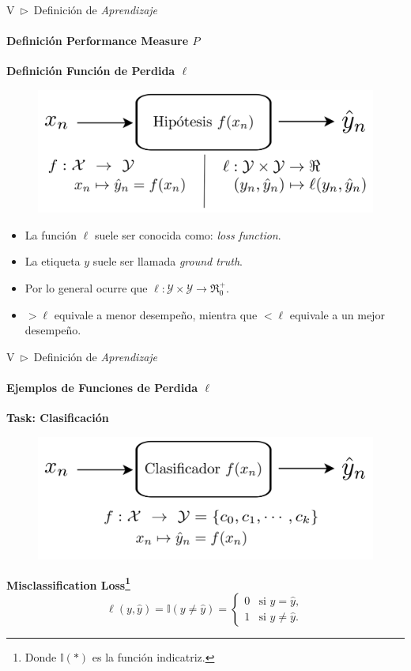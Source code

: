\documentclass[xcolor=dvipsnames]{beamer}
\begin{document}
    \begin{frame}{V~$\rhd$~Definición de \textit{Aprendizaje}}
    \framesubtitle{Definición Performance Measure \( P \)}
        \textbf{\Large{Definición Función de Perdida $\ell$}}
        \begin{figure}
            \centering
            \includegraphics[width=0.5\linewidth]{imgs/def03/measure03.png}
        \end{figure}
        \begin{itemize}
            \item La función $\ell$ suele ser conocida como: \textit{loss function}.
            \item La etiqueta $y$ suele ser llamada \textit{ground truth}.
            \item Por lo general ocurre que $\ell:\mathcal{Y}\times\mathcal{Y}\rightarrow\Re^{+}_{0}$.
            \item $>\ell$ equivale a menor desempeño, mientra que $<\ell$ equivale a un mejor desempeño.
        \end{itemize}
    \end{frame}

    \begin{frame}{V~$\rhd$~Definición de \textit{Aprendizaje}}
    \framesubtitle{Ejemplos de Funciones de Perdida $\ell$}
        \textbf{\Large{Task: Clasificación}}
        \begin{figure}
            \centering
            \includegraphics[width=0.7\linewidth]{imgs/def01/task03.png}
        \end{figure}
        \textbf{\Large{Misclassification Loss}\footnote{Donde $\mathbb{I}(*)$ es la función indicatriz.}}
        \begin{equation*}
            \ell(y, \hat{y}) = \mathbb{I}(y \neq \hat{y}) = 
            \begin{cases} 
            0 & \text{si } y = \hat{y}, \\
            1 & \text{si } y \neq \hat{y}.
            \end{cases}
        \end{equation*}
    \end{frame}
\end{document}
